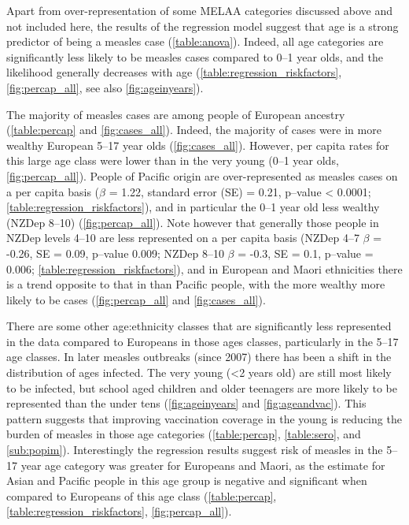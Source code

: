 \documentclass{article}
\begin{document}
Apart from over-representation of some MELAA categories discussed above and not included here, the results of the regression model suggest that age is a strong predictor of being a measles case (\autoref{table:anova}). Indeed, all age categories are significantly less likely to be measles cases compared to 0--1 year olds, and the likelihood generally decreases with age (\autoref{table:regression_riskfactors}, \autoref{fig:percap_all}, see also \autoref{fig:ageinyears}).

The majority of measles cases are among people of European ancestry (\autoref{table:percap} and \autoref{fig:cases_all}). Indeed, the majority of cases were in more wealthy European 5--17 year olds (\autoref{fig:cases_all}). However, per capita rates for this large age class were lower than in the very young (0--1 year olds, \autoref{fig:percap_all}). People of Pacific origin are over-represented as measles cases on a per capita basis ($\beta$ = 1.22, standard error (SE) = 0.21, p--value < 0.0001; \autoref{table:regression_riskfactors}), and in particular the 0--1 year old less wealthy (NZDep 8--10) (\autoref{fig:percap_all}). Note however that generally those people in NZDep levels 4--10 are less represented on a per capita basis (NZDep 4--7 $\beta$ = -0.26, SE = 0.09, p--value 0.009; NZDep 8--10 $\beta$ = -0.3, SE = 0.1, p--value = 0.006; \autoref{table:regression_riskfactors}), and in European and Maori ethnicities there is a trend opposite to that in than Pacific people, with the more wealthy more likely to be cases (\autoref{fig:percap_all} and \autoref{fig:cases_all}).

There are some other age:ethnicity classes that are significantly less represented in the data compared to Europeans in those ages classes, particularly in the 5--17 age classes. In later measles outbreaks (since 2007) there has been a shift in the distribution of ages infected. The very young (<2 years old) are still most likely to be infected, but school aged children and older teenagers are more likely to be represented than the under tens (\autoref{fig:ageinyears} and \autoref{fig:ageandvac}). This pattern suggests that improving vaccination coverage in the young is reducing the burden of measles in those age categories (\autoref{table:percap}, \autoref{table:sero}, and \autoref{sub:popim}). Interestingly the regression results suggest risk of measles in the 5--17 year age category was greater for Europeans and Maori, as the estimate for Asian and Pacific people in this age group is negative and significant when compared to Europeans of this age class (\autoref{table:percap}, \autoref{table:regression_riskfactors}, \autoref{fig:percap_all}).
\end{document}
